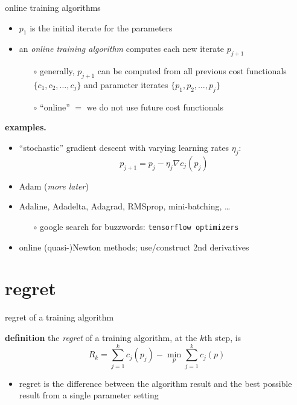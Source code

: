 \documentclass[xcolor={svgnames},
               hyperref={colorlinks,citecolor=DeepPink4,linkcolor=FireBrick,urlcolor=Maroon}]
               {beamer}
\newcommand{\grad}{\nabla}
\begin{document}
\begin{frame}{online training algorithms}

\begin{itemize}
\item $p_1$ is the initial iterate for the parameters
\item an \emph{online training algorithm} computes each new iterate $p_{j+1}$
    \begin{itemize}
    \item[$\circ$] generally, $p_{j+1}$ can be computed from all previous cost functionals $\{c_1,c_2,\dots,c_j\}$ and parameter iterates $\{p_1,p_2,\dots,p_j\}$
    \item[$\circ$] ``online'' $=$ we do not use future cost functionals
    \end{itemize}
\end{itemize}

\bigskip
\textbf{examples.}
\begin{itemize}
\item ``stochastic'' gradient descent with varying learning rates $\eta_j$:
   $$p_{j+1} = p_j - \eta_j \grad c_j(p_j)$$
\item Adam (\emph{more later})
\item Adaline, Adadelta, Adagrad, RMSprop, mini-batching, \dots
    \begin{itemize}
    \item[$\circ$] google search for buzzwords: \quad \texttt{tensorflow optimizers}
    \end{itemize}
\item online (quasi-)Newton methods; use/construct 2nd derivatives
\end{itemize}
\end{frame}


\section{regret}

\begin{frame}{regret of a training algorithm}

\begin{block}{\textbf{definition}}
the \emph{regret} of a training algorithm, at the $k$th step, is
    $$R_k = \sum_{j=1}^k c_j(p_j) - \min_p \sum_{j=1}^k c_j(p)$$
\end{block}

\begin{itemize}
\item regret is the difference between the algorithm result and the best possible result from a single parameter setting
\end{itemize}
\end{frame}
\end{document}
